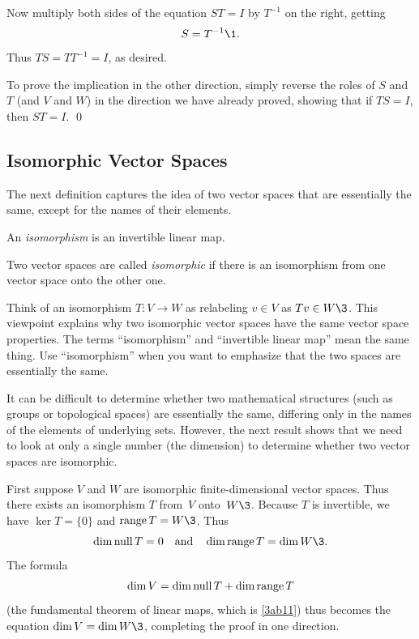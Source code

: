 Now multiply both sides of the equation $ST = I$ by $T^{-1}$ on the right, getting
\[
S = T^{-1}\1.
\]
Thus $TS = TT^{-1} = I$, as desired.

To prove the implication in the other direction, simply reverse the roles of $S$ and $T$ (and $V$ and $W$) in the direction we have already proved, showing that if $TS = I$, then $ST = I$.
\qed

\pagebreak[3]

\subsection{Isomorphic Vector Spaces}

The next definition captures the idea of two vector spaces that are essentially the same, except for the names of their elements.

{\begin{Itemize}
\item
An \emph{isomorphism} is an invertible linear map.
\item
Two vector spaces are called \emph{isomorphic}
if there is an isomorphism from one  vector space onto the other one.
\end{Itemize}}


Think of an isomorphism $T\colon V \to W $ as relabeling $v \in V$ as $Tv \in W\3$. This viewpoint explains why two isomorphic  vector spaces have the same vector
space properties. The terms ``isomorphism'' and ``invertible linear map'' mean
the same thing. Use ``isomorphism'' when you want to emphasize that the two spaces are essentially the same.

It can be difficult to determine whether two mathematical structures (such as groups or topological spaces) are essentially the same, differing only in the names of the elements of underlying sets. However, the next result shows that we need to look at only a single number (the dimension) to determine whether two vector spaces are isomorphic.


\proof
First suppose $V$ and $W$ are isomorphic finite-dimensional vector
spaces.  Thus there exists an isomorphism $T$ from~$V$ onto~$W\3$.
Because $T$ is invertible, we have $\ker T = \{0\}$ and
$\ran T = W\3$.  Thus
\[
\dim \ker T = 0 \andd \dim \ran T = \dim W\3.
\]
The formula
\[
\dim V = \dim \operatorname{null} T + \dim \operatorname{range} T
\]
(the fundamental theorem of linear maps, which is \ref{3ab11}) thus becomes the equation $\dim V = \dim W\3$, completing the proof in one direction.

